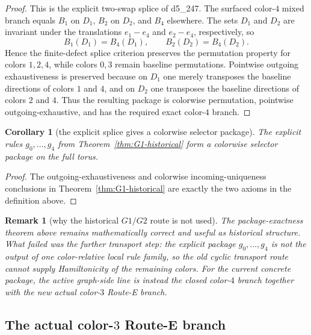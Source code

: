 \documentclass[11pt]{article}
\newtheorem{corollary}[theorem]{Corollary}
\newtheorem{remark}[theorem]{Remark}
\begin{document}
\begin{proof}
This is the explicit two-swap splice of d5\_247.
The surfaced color-$4$ mixed branch equals \(B_1\) on \(D_1\), \(B_2\) on \(D_2\),
and \(B_4\) elsewhere.
The sets \(D_1\) and \(D_2\) are invariant under the translations
\(e_1-e_4\) and \(e_2-e_4\), respectively, so
\[
B_1(D_1)=B_4(D_1),
\qquad
B_2(D_2)=B_4(D_2).
\]
Hence the finite-defect splice criterion preserves the permutation property for
colors \(1,2,4\), while colors \(0,3\) remain baseline permutations.
Pointwise outgoing exhaustiveness is preserved because on \(D_1\) one merely
transposes the baseline directions of colors \(1\) and \(4\), and on \(D_2\) one
transposes the baseline directions of colors \(2\) and \(4\).
Thus the resulting package is colorwise permutation, pointwise outgoing-exhaustive,
and has the required exact color-$4$ branch.
\end{proof}

\begin{corollary}[the explicit splice gives a colorwise selector package]
\label{cor:colorwise-package}
The explicit rules $g_0,\dots,g_4$ from Theorem~\ref{thm:G1-historical} form a colorwise
selector package on the full torus.
\end{corollary}

\begin{proof}
The outgoing-exhaustiveness and colorwise incoming-uniqueness conclusions in
Theorem~\ref{thm:G1-historical} are exactly the two axioms in the definition above.
\end{proof}

\begin{remark}[why the historical \(G1/G2\) route is not used]
The package-exactness theorem above remains mathematically correct and useful as
historical structure.
What failed was the further transport step: the explicit package \(g_0,\dots,g_4\)
is not the output of one color-relative local rule family, so the old cyclic
transport route cannot supply Hamiltonicity of the remaining colors.
For the current concrete package, the active graph-side line is instead the
closed color-$4$ branch together with the new actual color-$3$ Route-E branch.
\end{remark}

\subsection{The actual color-\texorpdfstring{$3$}{3} Route-E branch}
\end{document}
